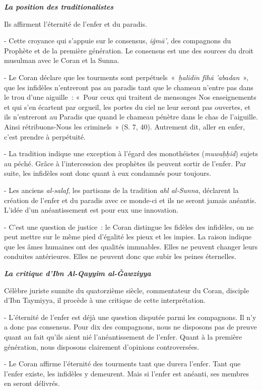 \emph{\textbf{La position des traditionalistes}}

Ils affirment l'éternité de l'enfer et du paradis.

- Cette croyance qui s'appuie sur le consensus, \emph{iǧmā'}, des
compagnons du Prophète et de la première génération. Le consensus est
une des sources du droit musulman avec le Coran et la Sunna.

- Le Coran déclare que les tourments sont perpétuels~«~\emph{ḫalidīn
fîhā 'abadan}~», que les infidèles n'entreront pas au paradis tant que
le chameau n'entre pas dans le trou d'une aiguille~: «~Pour ceux qui
traitent de mensonges Nos enseignements et qui s'en écartent par
orgueil, les portes du ciel ne leur seront pas ouvertes, et ils
n'entreront au Paradis que quand le chameau pénètre dans le chas de
l'aiguille. Ainsi rétribuons-Nous les criminels~» (S. 7, 40). Autrement
dit, aller en enfer, c'est prendre à perpétuité.

- La tradition indique une exception à l'égard des monothéistes
(\emph{muwaḥḥid}) sujets au péché. Grâce à l'intercession des prophètes
ils peuvent sortir de l'enfer. Par suite, les infidèles sont donc quant
à eux condamnés pour toujours.

- Les anciens \emph{al-salaf}, les partisans de la tradition \emph{ahl
al-Sunna}, déclarent la création de l'enfer et du paradis avec ce
monde-ci et ils ne seront jamais anéantis. L'idée d'un anéantissement
est pour eux une innovation.

- C'est une question de justice~: le Coran distingue les fidèles des
infidèles, on ne peut mettre sur le même pied d'égalité les pieux et les
impies. La raison indique que les âmes humaines ont des qualités
immuables. Elles ne peuvent changer leurs conduites antérieures. Elles
ne peuvent donc que subir les peines éternelles.

\emph{\textbf{La critique d'Ibn Al-Qayyim al-Ǧawziyya}}

Célèbre juriste sunnite du quatorzième siècle, commentateur du Coran,
disciple d'Ibn Taymiyya, il procède à une critique de cette
interprétation.

- L'éternité de l'enfer est déjà une question disputée parmi les
compagnons. Il n'y a donc pas consensus. Pour dix des compagnons, nous
ne disposons pas de preuve quant au fait qu'ils aient nié
l'anéantissement de l'enfer. Quant à la première génération, nous
disposons clairement d'opinions controversées.

- Le Coran affirme l'éternité des tourments tant que durera l'enfer.
Tant que l'enfer existe, les infidèles y demeurent. Mais si l'enfer est
anéanti, ses membres en seront délivrés.

